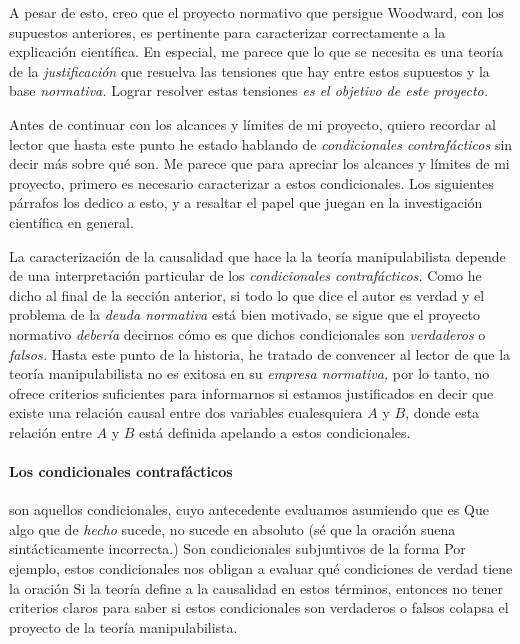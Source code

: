 {{{A pesar de esto, creo que el proyecto
normativo que persigue Woodward, con los supuestos
anteriores, es pertinente para caracterizar correctamente a
la explicación científica. En especial,
me parece que lo que se necesita es una teoría de la
\emph{justificación} que resuelva las tensiones que hay
entre estos supuestos y la base \emph{normativa.} Lograr
resolver estas tensiones \emph{es el objetivo de este
proyecto.}

Antes de continuar con los alcances y límites de mi
proyecto, quiero recordar al lector que hasta este punto he estado hablando de \emph{condicionales
contrafácticos} sin decir más sobre qué son. Me parece que
para apreciar los alcances y límites de mi proyecto, primero
es necesario caracterizar a estos condicionales. Los
siguientes párrafos los dedico a esto, y a resaltar el papel
que juegan en la investigación científica en general.

La caracterización de la causalidad que hace la
la teoría manipulabilista depende de una interpretación
particular de los \emph{condicionales contrafácticos.} Como
he dicho al final de la sección anterior, si todo lo que
dice el autor es verdad y el problema de la \emph{deuda
normativa} está bien motivado, se sigue que el proyecto
normativo \emph{debería} decirnos cómo es que dichos
condicionales son \emph{verdaderos} o \emph{falsos.} Hasta
este punto de la historia, he tratado de convencer al lector
de que la teoría manipulabilista no es exitosa en su
\emph{empresa normativa,} por lo tanto, no ofrece criterios
suficientes para informarnos si estamos justificados en
decir que existe una relación causal entre dos variables
cualesquiera $A$ y $B$, donde esta relación entre $A$ y $B$
está definida apelando a estos condicionales.

\paragraph{Los condicionales contrafácticos} son aquellos
condicionales, cuyo antecedente evaluamos asumiendo que es
 Que algo que de \emph{hecho}
sucede, no sucede en absoluto (sé que la oración suena
sintácticamente incorrecta.) Son condicionales subjuntivos
de la forma  Por ejemplo, estos condicionales nos
obligan a evaluar qué condiciones de verdad tiene la oración
 Si la teoría define a la causalidad
en estos términos, entonces no tener criterios claros para
saber si estos condicionales son verdaderos o falsos
colapsa el proyecto de la teoría manipulabilista.

}}}
